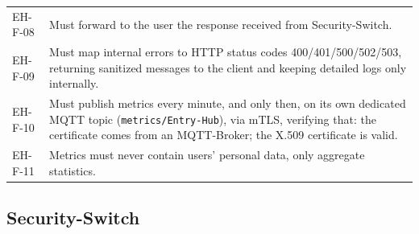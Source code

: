 \begin{longtable}{p{2.6cm} p{\dimexpr\linewidth-2.6cm-4\tabcolsep\relax}}
EH-F-08 & Must forward to the user the response received from Security-Switch. \\
EH-F-09 & Must map internal errors to HTTP status codes 400/401/500/502/503, returning sanitized messages to the client and keeping detailed logs only internally. \\
EH-F-10 & Must publish metrics every minute, and only then, on its own dedicated MQTT topic (\texttt{metrics/Entry-Hub}), via mTLS, verifying that: the certificate comes from an MQTT-Broker; the X.509 certificate is valid. \\
EH-F-11 & Metrics must never contain users' personal data, only aggregate statistics. \\
\end{longtable}

\subsection{Security-Switch}


